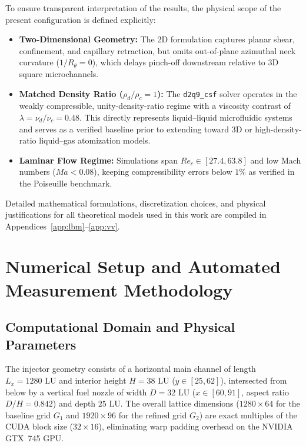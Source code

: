 \documentclass[11pt,a4paper]{article}
\begin{document}
To ensure transparent interpretation of the results, the physical scope of the present configuration is defined explicitly:
\begin{itemize}
    \item \textbf{Two-Dimensional Geometry:} The 2D formulation captures planar shear, confinement, and capillary retraction, but omits out-of-plane azimuthal neck curvature ($1/R_\theta = 0$), which delays pinch-off downstream relative to 3D square microchannels.
    \item \textbf{Matched Density Ratio ($\rho_d / \rho_c = 1$):} The \texttt{d2q9\_csf} solver operates in the weakly compressible, unity-density-ratio regime with a viscosity contrast of $\lambda = \nu_d / \nu_c = 0.48$. This directly represents liquid--liquid microfluidic systems and serves as a verified baseline prior to extending toward 3D or high-density-ratio liquid--gas atomization models.
    \item \textbf{Laminar Flow Regime:} Simulations span $Re_c \in [27.4, 63.8]$ and low Mach numbers ($Ma < 0.08$), keeping compressibility errors below $1\%$ as verified in the Poiseuille benchmark.
\end{itemize}

Detailed mathematical formulations, discretization choices, and physical justifications for all theoretical models used in this work are compiled in Appendices~\ref{app:lbm}--\ref{app:vv}.
\section{Numerical Setup and Automated Measurement Methodology}

\subsection{Computational Domain and Physical Parameters}

The injector geometry consists of a horizontal main channel of length $L_x = 1280\text{ LU}$ and interior height $H = 38\text{ LU}$ ($y \in [25, 62]$), intersected from below by a vertical fuel nozzle of width $D = 32\text{ LU}$ ($x \in [60, 91]$, aspect ratio $D/H = 0.842$) and depth $25\text{ LU}$. The overall lattice dimensions ($1280 \times 64$ for the baseline grid $G_1$ and $1920 \times 96$ for the refined grid $G_2$) are exact multiples of the CUDA block size ($32 \times 16$), eliminating warp padding overhead on the NVIDIA GTX~745 GPU.
\end{document}
